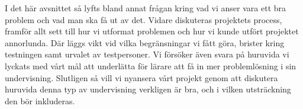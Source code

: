 \textcolor{Mahogany}{
    I det här avsnittet så lyfts bland annat frågan kring vad vi anser vara ett bra problem och vad man ska få ut av det. Vidare diskuteras projektets process, framför allt sett till hur vi utformat problemen och hur vi kunde utfört projektet annorlunda. Där läggs vikt vid vilka begränsningar vi fått göra, brister kring testningen samt urvalet av testpersoner.
    Vi försöker även svara på huruvida vi lyckats med vårt mål att underlätta för lärare att få in mer problemlösning i sin undervisning. Slutligen så vill vi nyansera vårt projekt genom att diskutera huruvida denna typ av undervisning verkligen är bra, och i vilken utsträckning den bör inkluderas.
}